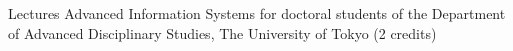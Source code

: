 \begin{rubric}{Lectures}
\entry*[2021.06 -- 2022.06] Advanced Information Systems for doctoral students of the Department of Advanced Disciplinary Studies, The University of Tokyo (2 credits)
\end{rubric}
